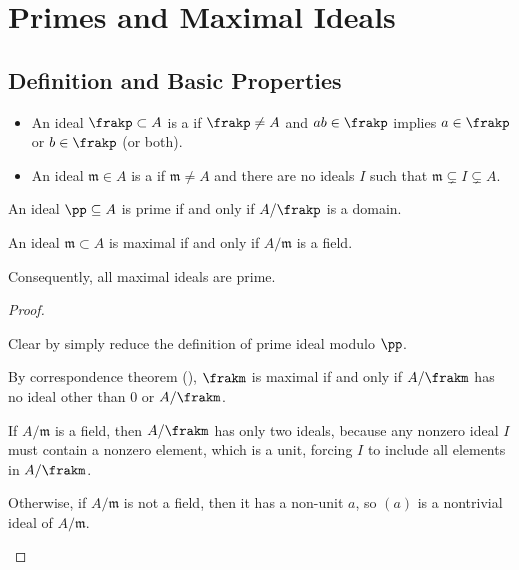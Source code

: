 \section{Primes and Maximal Ideals}
\label{sec:primes_maximal_ideals}
\subsection{Definition and Basic Properties}
\begin{definition}
    \label{def:prime_maximal}
    \begin{itemize}
    \item An ideal $\frakp\subset A$ is a 
    if $\frakp\neq A$ and $ab\in \frakp$
    implies $a\in \frakp$ or $b\in \frakp$ (or both).
    \item An ideal $\mathfrak m\in A$ is a 
    if $\mathfrak m\neq A$ and
    there are no ideals $I$ such that
    $\mathfrak m\subsetneq I\subsetneq A$.
    \end{itemize}
\end{definition}
\begin{proposition}
    \begin{alphenum}
    \item An ideal $\pp\subseteq A$ is prime 
    if and only if $A/\frakp$ is a domain.
    \item An ideal $\mathfrak m\subset A$ is maximal
    if and only if $A/\mathfrak m$ is a field.
    \end{alphenum}
    Consequently, all maximal ideals are prime.
\end{proposition}
\begin{proof}
    \begin{alphenum}
    \item 
    Clear by simply reduce the definition of prime ideal modulo $\pp$.
    \item 
    By correspondence theorem (),
    $\frakm$ is maximal if and only if $A/\frakm$ has no ideal other than $0$ or $A/\frakm$.
    
    If $A/\mathfrak m$ is a field, then $A/\frakm$
    has only two ideals, because any nonzero ideal $I$
    must contain a nonzero element, which is a unit,
    forcing $I$ to include all elements in $A/\frakm$.
    
    Otherwise, if $A/\mathfrak m$ is not a field,
    then it has a non-unit $a$,
    so $(a)$ is a nontrivial ideal of $A/\mathfrak m$. 
    \qedhere 
    \end{alphenum}
\end{proof}
